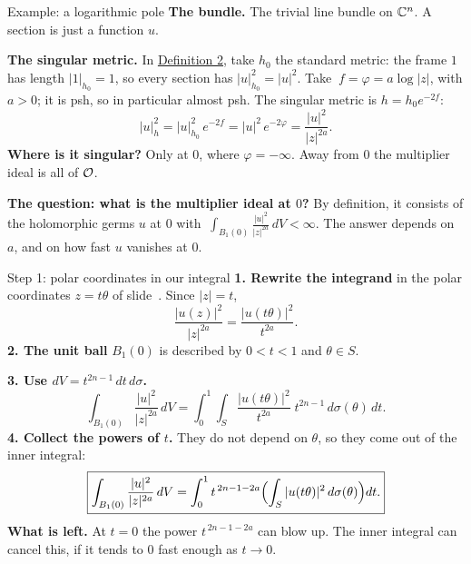 \begin{frame}{Example: a logarithmic pole}
\label{fr:example-a-logarithmic-pole-43}
\textbf{The bundle.} The trivial line bundle on \(\mathbb C^n\). A section is just a function \(u\).
\par\medskip
\textbf{The singular metric.} In \hyperlink{fr:singular-def}{Definition 2}, take \(h_0\) the standard metric: the frame \(1\) has length \(|1|_{h_0}=1\), so every section has \(|u|_{h_0}^2=|u|^2\). Take
\(\ f=\varphi=a\log|z|\), with \(a>0\); it is psh, so in particular almost psh. The singular metric is \(h=h_0e^{-2f}\):
\[
|u|_h^2=|u|_{h_0}^2\,e^{-2f}=|u|^2\,e^{-2\varphi}=\frac{|u|^2}{|z|^{2a}} .
\]
\textbf{Where is it singular?} Only at \(0\), where \(\varphi=-\infty\). Away from \(0\) the multiplier ideal is all of \(\mathcal O\).
\par\medskip
\textbf{The question: what is the multiplier ideal at \(0\)?} By definition, it consists of the holomorphic germs \(u\) at \(0\) with
\(\ \displaystyle\int_{B_1(0)}\frac{|u|^2}{|z|^{2a}}\,dV<\infty\).
The answer depends on \(a\), and on how fast \(u\) vanishes at \(0\).
\end{frame}

\begin{frame}{Step 1: polar coordinates in our integral}
\label{fr:ex-step1-applied}
\textbf{1. Rewrite the integrand} in the polar coordinates \(z=t\theta\) of slide~\hyperlink{fr:polar-cn}{\pageref{fr:polar-cn}}. Since \(|z|=t\),
\[
\frac{|u(z)|^2}{|z|^{2a}}=\frac{|u(t\theta)|^2}{t^{2a}} .
\]
\textbf{2. The unit ball} \(B_1(0)\) is described by \(0<t<1\) and \(\theta\in S\).
\par\medskip
\textbf{3. Use \(dV=t^{2n-1}\,dt\,d\sigma\).}
\[
\int_{B_1(0)}\frac{|u|^2}{|z|^{2a}}\,dV
=\int_0^1\!\!\int_S\frac{|u(t\theta)|^2}{t^{2a}}\;t^{2n-1}\,d\sigma(\theta)\,dt .
\]
\textbf{4. Collect the powers of \(t\).} They do not depend on \(\theta\), so they come out of the inner integral:
\[
\boxed{\int_{B_1(0)}\frac{|u|^2}{|z|^{2a}}\,dV
=\int_0^1t^{\,2n-1-2a}\Bigl(\int_S|u(t\theta)|^2\,d\sigma(\theta)\Bigr)dt .}
\]
\textbf{What is left.} At \(t=0\) the power \(t^{\,2n-1-2a}\) can blow up. The inner integral can cancel this, if it tends to \(0\) fast enough as \(t\to0\).
\end{frame}

